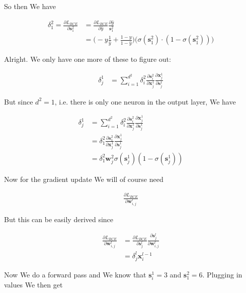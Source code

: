 \documentclass{article}
\begin{document}
	 So then We have 
	
	\begin{align}
	 	\delta^2_1 = \frac{\partial L_{BCE}}{\partial \mathbf{s}^2_1} &= \frac{\partial L_{BCE}}{\partial \hat{y}} \frac{\partial \hat{y}}{\mathbf{s}^2_1} \\
	 	&= \bigg( -y\frac{1}{\hat{y}}  + \frac{1-y}{1-\hat{y}} \bigg) \bigg( \sigma(\mathbf{s}^2_1)\cdot(1-\sigma(\mathbf{s}^2_1)) \bigg)
	 \end{align}
	 
	 Alright. We only have one more of these to figure out:
	 
	 \begin{align}
	 	\delta^1_j &= \sum^{d^2}_{i=1}  \delta^2_i \frac{\partial \mathbf{s}^2_i}{\partial \mathbf{x}^{1}_j}\frac{\partial \mathbf{x}^{1}_j}{\partial \mathbf{s}^{1}_j}
	 \end{align}
	 
	 
	 But since $d^2 = 1$, i.e. there is only one neuron in the output layer, We have

	\begin{align}
	 	\delta^1_j &= \sum^{d^2}_{i=1}  \delta^2_i \frac{\partial \mathbf{s}^2_i}{\partial \mathbf{x}^{1}_j}\frac{\partial \mathbf{x}^{1}_j}{\partial \mathbf{s}^{1}_j}\\
	 	&=   \delta^2_1 \frac{\partial \mathbf{s}^2_1}{\partial \mathbf{x}^{1}_j}\frac{\partial \mathbf{x}^{1}_j}{\partial \mathbf{s}^{1}_j}\\
	 	&=   \delta^2_1 \mathbf{w}^2_j \sigma(\mathbf{s}^{1}_j)(1-\sigma(\mathbf{s}^{1}_j))
	 \end{align}
	 
	 Now for the gradient update We will of course need
	 
	 \begin{align}
	 	\frac{\partial L_{BCE}}{\partial \mathbf{w}^l_{i, j}}
	 \end{align}
	 
	 But this can be easily derived since
	 
	 \begin{align}
	 	\frac{\partial L_{BCE}}{\partial \mathbf{w}^l_{i, j}} &= \frac{\partial L_{BCE}}{\partial \mathbf{s}^l_j}\frac{\partial \mathbf{s}^l_j}{\partial \mathbf{w}^l_{i, j}}\\
	 	&= \delta^l_j\mathbf{x}^{l-1}_i
	 \end{align}
	 
	 Now We do a forward pass and We know that $\mathbf{s}^1_i = 3$ and $\mathbf{s}^2_1 = 6$. Plugging in values We then get
\end{document}
